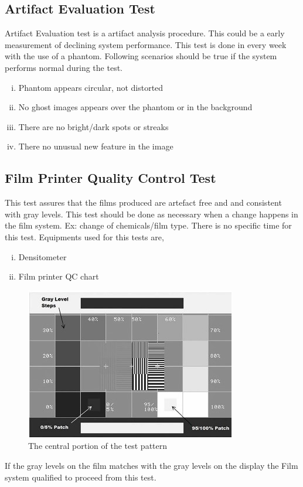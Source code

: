 \documentclass[12pt]{article}
\begin{document}
\subsection{Artifact Evaluation Test}
Artifact Evaluation test is a artifact analysis procedure. This could be a early measurement of declining system performance. This test is done in every week with the use of a phantom. 
Following scenarios should be true if the system performs normal during the test.
\begin{enumerate}[i.]
    \item Phantom appears circular, not distorted
    \item No ghost images appears over the phantom or in the background
    \item There are no bright/dark spots or streaks
    \item There no unusual new feature in the image
\end{enumerate}

\subsection{Film Printer Quality Control Test}
This test assures that the films produced are artefact free and and consistent with gray levels. This test should be done as necessary when a change happens in the film system. Ex: change of chemicals/film type. There is no specific time for this test. Equipments used for this tests are,
\begin{enumerate}[i.]
    \item Densitometer
    \item Film printer QC chart
\end{enumerate}
\begin{figure}[h!]
    \centering
    \includegraphics[width=0.5\linewidth]{ph5.jpg}
    \caption{\small{The central portion of the test pattern}}
    \label{fig:The central portion of the SMPTE test pattern}
\end{figure}
If the gray levels on the film matches with the gray levels on the display the Film system qualified to proceed from this test. 
\end{document}
